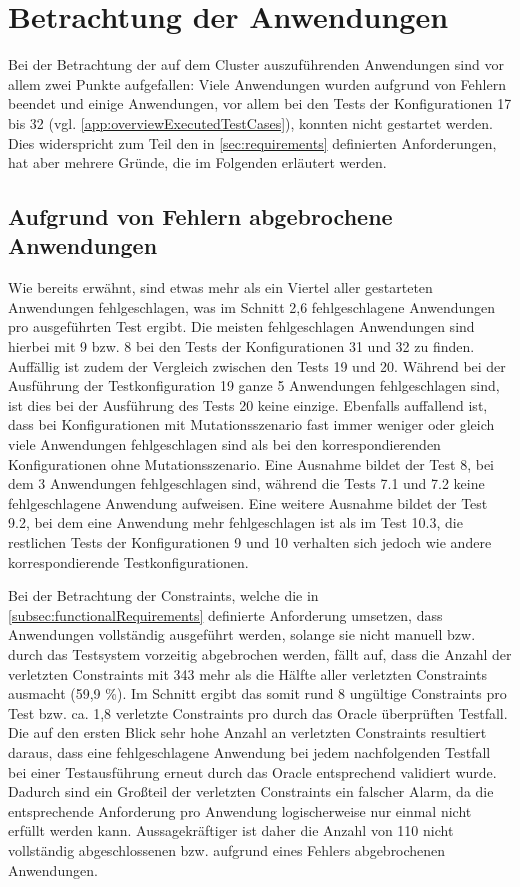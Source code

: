 \section{Betrachtung der Anwendungen}
\label{sec:appEval}

Bei der Betrachtung der auf dem Cluster auszuführenden Anwendungen sind vor allem zwei Punkte aufgefallen:
Viele Anwendungen wurden aufgrund von Fehlern beendet und einige Anwendungen, vor allem bei den Tests der Konfigurationen 17 bis 32 (vgl. \cref{app:overviewExecutedTestCases}), konnten nicht gestartet werden.
Dies widerspricht zum Teil den in \cref{sec:requirements} definierten Anforderungen, hat aber mehrere Gründe, die im Folgenden erläutert werden.

\subsection{Aufgrund von Fehlern abgebrochene Anwendungen}
\label{subsec:failedApps}

Wie bereits erwähnt, sind etwas mehr als ein Viertel aller gestarteten Anwendungen fehlgeschlagen, was im Schnitt 2,6 fehlgeschlagene Anwendungen pro ausgeführten Test ergibt.
Die meisten fehlgeschlagen Anwendungen sind hierbei mit 9 bzw. 8 bei den Tests der Konfigurationen 31 und 32 zu finden.
Auffällig ist zudem der Vergleich zwischen den Tests 19 und 20.
Während bei der Ausführung der Testkonfiguration 19 ganze 5 Anwendungen fehlgeschlagen sind, ist dies bei der Ausführung des Tests 20 keine einzige.
Ebenfalls auffallend ist, dass bei Konfigurationen mit Mutationsszenario fast immer weniger oder gleich viele Anwendungen fehlgeschlagen sind als bei den korrespondierenden Konfigurationen ohne Mutationsszenario.
Eine Ausnahme bildet der Test 8, bei dem 3 Anwendungen fehlgeschlagen sind, während die Tests 7.1 und 7.2 keine fehlgeschlagene Anwendung aufweisen.
Eine weitere Ausnahme bildet der Test 9.2, bei dem eine Anwendung mehr fehlgeschlagen ist als im Test 10.3, die restlichen Tests der Konfigurationen 9 und 10 verhalten sich jedoch wie andere korrespondierende Testkonfigurationen.

Bei der Betrachtung der Constraints, welche die in \cref{subsec:functionalRequirements} definierte Anforderung umsetzen, dass Anwendungen vollständig ausgeführt werden, solange sie nicht manuell bzw. durch das Testsystem vorzeitig abgebrochen werden, fällt auf, dass die Anzahl der verletzten Constraints mit 343 mehr als die Hälfte aller verletzten Constraints ausmacht (59,9 \%).
Im Schnitt ergibt das somit rund 8 ungültige Constraints pro Test bzw. ca. 1,8 verletzte Constraints pro durch das Oracle überprüften Testfall.
Die auf den ersten Blick sehr hohe Anzahl an verletzten Constraints resultiert daraus, dass eine fehlgeschlagene Anwendung bei jedem nachfolgenden Testfall bei einer Testausführung erneut durch das Oracle entsprechend validiert wurde.
Dadurch sind ein Großteil der verletzten Constraints ein falscher Alarm, da die entsprechende Anforderung pro Anwendung logischerweise nur einmal nicht erfüllt werden kann.
Aussagekräftiger ist daher die Anzahl von 110 nicht vollständig abgeschlossenen bzw. aufgrund eines Fehlers abgebrochenen Anwendungen.

